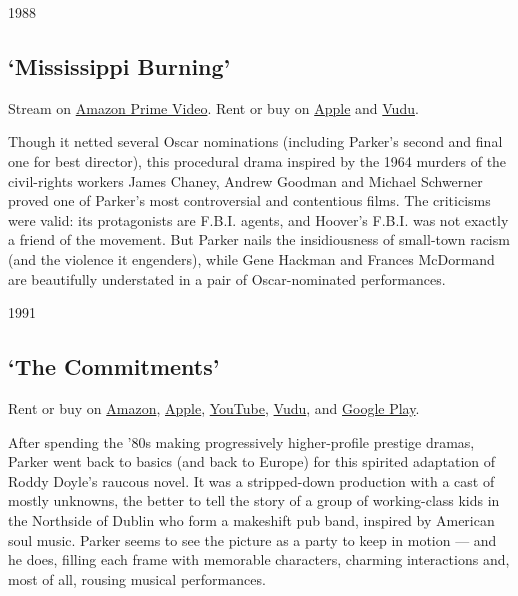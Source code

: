 1988

\hypertarget{mississippi-burning}{%
\subsection{`Mississippi Burning'}\label{mississippi-burning}}

Stream on
\href{https://www.amazon.com/gp/video/detail/B07GT8SW6Y/ref=atv_dl_rdr?tag=justwatch09-20}{Amazon
Prime Video}. Rent or buy on
\href{https://itunes.apple.com/us/movie/mississippi-burning/id834495884?ign-mpt=uo\%3D4}{Apple}
and
\href{https://www.vudu.com/content/movies/details/Mississippi-Burning/140482}{Vudu}.

Though it netted several Oscar nominations (including Parker's second
and final one for best director), this procedural drama inspired by the
1964 murders of the civil-rights workers James Chaney, Andrew Goodman
and Michael Schwerner proved one of Parker's most controversial and
contentious films. The criticisms were valid: its protagonists are
F.B.I. agents, and Hoover's F.B.I. was not exactly a friend of the
movement. But Parker nails the insidiousness of small-town racism (and
the violence it engenders), while Gene Hackman and Frances McDormand are
beautifully understated in a pair of Oscar-nominated performances.

1991

\hypertarget{the-commitments}{%
\subsection{`The Commitments'}\label{the-commitments}}

Rent or buy on
\href{https://www.amazon.com/gp/video/detail/B01J6WRIEI/ref=atv_dp_share_cu_r}{Amazon},
\href{https://itunes.apple.com/us/movie/the-commitments/id1099403600?ign-mpt=uo\%3D4}{Apple},
\href{https://www.youtube.com/watch?v=uBzRrvbyZqE}{YouTube},
\href{https://www.vudu.com/content/movies/details/The-Commitments/8254}{Vudu},
and
\href{https://play.google.com/store/movies/details/The_Commitments?gl=US\&hl=en\&id=uBzRrvbyZqE\&PAffiliateID=110l4uj}{Google
Play}.

After spending the '80s making progressively higher-profile prestige
dramas, Parker went back to basics (and back to Europe) for this
spirited adaptation of Roddy Doyle's raucous novel. It was a
stripped-down production with a cast of mostly unknowns, the better to
tell the story of a group of working-class kids in the Northside of
Dublin who form a makeshift pub band, inspired by American soul music.
Parker seems to see the picture as a party to keep in motion --- and he
does, filling each frame with memorable characters, charming
interactions and, most of all, rousing musical performances.

